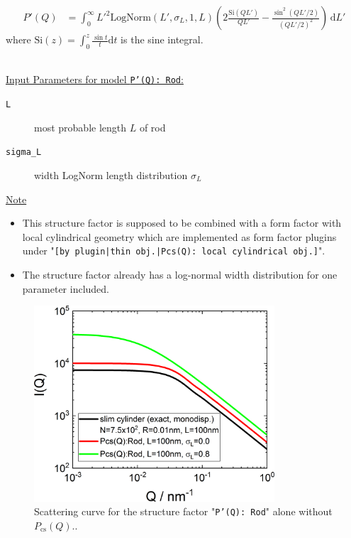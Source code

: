 \begin{align}
P'(Q) &= \int_0^\infty L'^2 \mathrm{LogNorm}(L',\sigma_L,1,L) \left(2 \frac{\mathrm{Si}(QL')}{QL'}-\frac{\sin^2(QL'/2)}{(QL'/2)^2} \right)\, \mathrm{d}L'
\label{eq:PprimeRod}
\end{align}
where $\mathrm{Si}(z)=\int_0^z\frac{\sin t}{t} \mathrm{d}t$ is the sine integral.

\vspace{5mm}

\hspace{1pt}\\
\uline{Input Parameters for model \texttt{P'(Q): Rod}:}\\
\begin{description}
\item[\texttt{L}]most probable length $L$ of rod
\item[\texttt{sigma\_L}] width LogNorm length distribution $\sigma_L$
\end{description}

\noindent
\uline{Note}
\begin{itemize}
  \item This structure factor is supposed to be combined with a form factor with local cylindrical geometry which are implemented as form factor plugins
under "\texttt{[by plugin|thin obj.|Pcs(Q): local cylindrical obj.]}".
\item The structure factor already has a log-normal width distribution for one parameter included.
\end{itemize}


\begin{figure}[htb]
\begin{center}
\includegraphics[width=0.8\textwidth,height=0.55\textwidth]{../images/form_factor/anisotropic/PprimeRod.png}
\end{center}
\caption{Scattering curve for the structure factor "\texttt{P'(Q): Rod}" alone without $P_\mathrm{cs}(Q)$..}
\label{fig_IQ:PprimeRod}
\end{figure}

